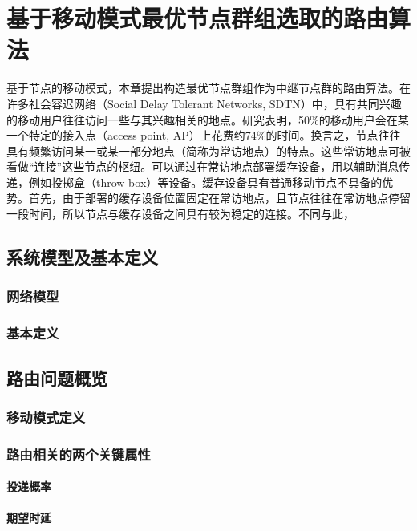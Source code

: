 \chapter{基于移动模式最优节点群组选取的路由算法}

基于节点的移动模式，本章提出构造最优节点群组作为中继节点群的路由算法。在许多社会容迟网络（Social Delay Tolerant Networks, SDTN）中，具有共同兴趣的移动用户往往访问一些与其兴趣相关的地点。研究表明，50\%的移动用户会在某一个特定的接入点（access point, AP）上花费约74\%的时间\cite{Henderson:2004ul}。换言之，节点往往具有频繁访问某一或某一部分地点（简称为常访地点）的特点。这些常访地点可被看做``连接''这些节点的枢纽。可以通过在常访地点部署缓存设备，用以辅助消息传递，例如投掷盒（throw-box）\cite{Ibrahim:2009we}等设备。缓存设备具有普通移动节点不具备的优势。首先，由于部署的缓存设备位置固定在常访地点，且节点往往在常访地点停留一段时间，所以节点与缓存设备之间具有较为稳定的连接。不同与此，

\section{系统模型及基本定义}

\subsection{网络模型}

\subsection{基本定义}

\section{路由问题概览}

\subsection{移动模式定义}

\subsection{路由相关的两个关键属性}

\subsubsection{投递概率}

\subsubsection{期望时延}

